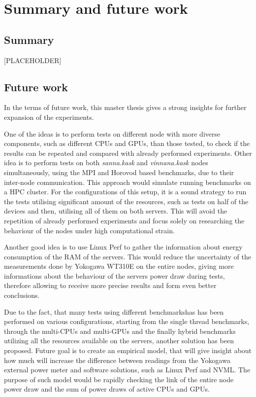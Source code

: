 \chapter{Summary and future work}

\section{Summary}

[PLACEHOLDER]

\section{Future work}

In the terms of future work, this master thesis gives a strong insights for
further expansion of the experiments.

One of the ideas is to perform tests
on different node with more diverse components, such as different CPUs and
GPUs, than those tested, to check if the results can be repeated and compared
with already performed experiments. Other idea is to perform tests on both 
\emph{sanna.kask} and \emph{vinnana.kask} nodes simultaneously, using the
MPI and Horovod based benchmarks, due to their inter-node communication.
This approach would simulate running benchmarks on a HPC cluster. For
the configurations of this setup, it is a sound strategy to run the tests
utilising significant amount of the resources, such as tests on half of the
devices and then, utilising all of them on both servers. This will avoid
the repetition of already performed experiments and focus solely on
researching the behaviour of the nodes under high computational strain.

Another good idea is to use Linux Perf to gather the information about energy
consumption of the RAM of the servers. This would reduce the uncertainty of
the measurements done by Yokogawa WT310E on the entire nodes, giving more
informations about the behaviour of the servers power draw during tests,
therefore allowing to receive more precise results and form even better
conclusions.

Due to the fact, that many tests using different benchmarkshas has been
performed on various configurations, starting from the single thread benchmarks,
through the multi-CPUs and multi-GPUs and the finally hybrid benchmarks
utilizing all the resources available on the servers, another solution has been
proposed. Future goal is to create an empirical model, that will give insight
about how much will increase the difference between readings from the Yokogawa
external power meter and software solutions, such as Linux Perf and NVML\@.
The purpose of such model would be rapidly checking the link of the 
entire node power draw and the sum of power draws of active CPUs and GPUs.

